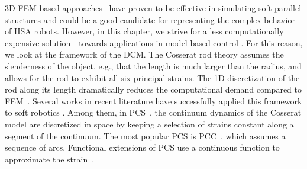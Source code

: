 3D-\gls{FEM} based approaches~\citep{farrell2020extension} have proven to be effective in simulating soft parallel structures \citep{vanneste2021enabling} and could be a good candidate for representing the complex behavior of \gls{HSA} robots. However, in this chapter, we strive for a less computationally expensive solution - towards applications in model-based control \citep{della2023model}. For this reason, we look at the framework of the \gls{DCM}. The Cosserat rod theory assumes the slenderness of the object, e.g., that the length is much larger than the radius, and allows for the rod to exhibit all six principal strains. The 1D discretization of the rod along its length dramatically reduces the computational demand compared to \gls{FEM}~\citep{gazzola2018forward}. 
%
Several works in recent literature have successfully applied this framework to soft robotics \citep{grazioso2019geometrically,sadati2021tmtdyn,armanini2023soft}. Among them, in \gls{PCS}~\citep{renda2018discrete}, the continuum dynamics of the Cosserat model are discretized in space by keeping a selection of strains constant along a segment of the continuum. %
The most popular \gls{PCS} is \gls{PCC}~\citep{webster2010design}, which assumes a sequence of arcs. Functional extensions of \gls{PCS} use a continuous function to approximate the strain~\citep{della2019control,renda2020geometric}. %

